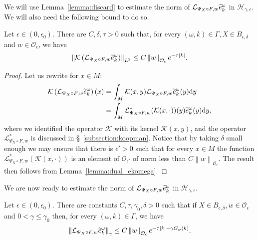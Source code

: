 \documentclass[AHL,Unicode,longabstracts,published]{cedram}
\newcommand{\n}[1]{\left\|#1\right\|}
\newcommand{\va}[1]{\left|#1\right|}
\newcommand{\clO}{\mathcal{O}}
\newcommand{\clL}{\mathcal{L}}
\newcommand{\clH}{\mathcal{H}}
\newcommand{\clK}{\mathcal{K}}
\newcommand{\rmd}{\mathrm{d}}
\let\oldtilde\tilde
\renewcommand*{\tilde}[1]{\mathchoice{\widetilde{#1}}{\widetilde{#1}}{\oldtilde{#1}}{\oldtilde{#1}}}
\newcommand{\clO}{\mathcal{O}}
\begin{document}
We will use Lemma~\ref{lemma:discard} to estimate the norm of $\clL_{\Psi_X \circ F,w} \tilde{e}_k^\omega$ in $\clH_{\gamma,\epsilon}$. We will also need the following bound to do so.

\begin{lemm}\label{lemma:estimee_analytic_rest}
Let $\epsilon \in(0,\epsilon_0)$. There are $C,\delta, \tau >0$ such that, for every $(\omega,k) \in \Gamma, X \in B_{\epsilon,\delta}$ and $w \in \clO_\epsilon$, we have
\begin{equation*}
\n{\clK \left(\clL_{\Psi_X \circ F,w} \tilde{e}_{k}^\omega\right)}_{L^2} \leq C \n{w}_{\clO_\epsilon} e^{- \tau \va{k}}.
\end{equation*}
\end{lemm}

\begin{proof}
Let us rewrite for $x \in M$:
\begin{equation*}
\begin{split}
\clK \left(\clL_{\Psi_X \circ F,w} \tilde{e}_{k}^\omega\right) (x) & = \int_M \clK (x,y) \clL_{\Psi_X \circ F,w} \tilde{e}_{k}^\omega(y) \rmd y \\
& = \int_M \clL_{\Psi_X \circ F,w}^* (\clK (x,\cdot))(y) \tilde{e}_{k}^\omega(y) \rmd y,
\end{split}
\end{equation*}
where we identified the operator $\clK $ with its kernel $\clK (x,y)$, and the operator $\clL_{\Psi_X \circ F,w}^*$ is discussed in \S~\ref{subsection:koopman}. Notice that by taking $\delta$ small enough we may ensure that there is $\epsilon' > 0$ such that for every $x \in M$ the function $\clL_{\Psi_X \circ F,w}^* (\clK (x,\cdot))$ is an element of $\clO_{\epsilon'}$ of norm less than $C \n{w}_{\clO_\epsilon}$. The result then follows from Lemma~\ref{lemma:dual_ekomega}.
\end{proof}

We are now ready to estimate the norm of $\clL_{\Psi_X \circ F,w}
\tilde{e}_k^\omega$ in $\clH_{\gamma,\epsilon}$.

\begin{lemm}\label{lemma:individual_bound}
Let $\epsilon \in (0,\epsilon_0)$. There are constants $C,\tau,\gamma_0,\delta > 0$ such that if $X \in B_{\epsilon,\delta}, w \in \clO_\epsilon$ and $0 < \gamma \leq \gamma_0$ then, for every $(\omega,k) \in \Gamma$, we have
\begin{equation*}
\n{\clL_{\Psi_X \circ F,w} \tilde{e}_{k}^\omega}_\gamma \leq C \n{w}_{\clO_\epsilon} e^{- \tau \va{k} - \gamma G_\omega(k)}.
\end{equation*}
\end{lemm}
\end{document}
